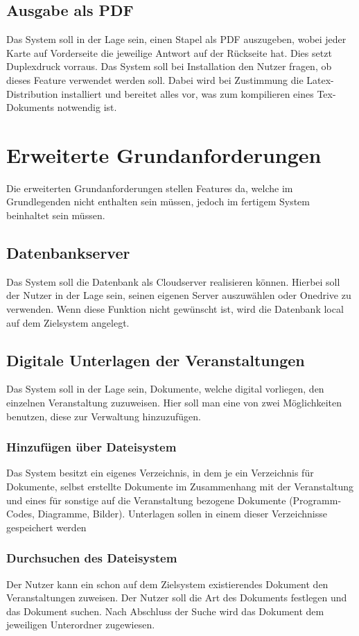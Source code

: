 \documentclass[
a4paper,
twoside,
DIV=12,
BCOR=8mm,
headlineinclude=true,
footinclude=false,
numbers=noenddot,
headheight=40pt, 11pt]{scrartcl}
\begin{document}
\subsection{Ausgabe als PDF}
Das System soll in der Lage sein, einen Stapel als PDF auszugeben, wobei jeder Karte auf Vorderseite die jeweilige Antwort auf der Rückseite hat. Dies setzt Duplexdruck vorraus. Das System soll bei Installation den Nutzer fragen, ob dieses Feature verwendet werden soll. Dabei wird bei Zustimmung die Latex-Distribution installiert und bereitet alles vor, was zum kompilieren eines Tex-Dokuments notwendig ist. 

\section{Erweiterte Grundanforderungen}
Die erweiterten Grundanforderungen stellen Features da, welche im Grundlegenden nicht enthalten sein müssen, jedoch im fertigem System beinhaltet sein müssen.
\subsection{Datenbankserver}
Das System soll die Datenbank als Cloudserver realisieren können. Hierbei soll der Nutzer in der Lage sein, seinen eigenen Server auszuwählen oder Onedrive zu verwenden. Wenn diese Funktion nicht gewünscht ist, wird die Datenbank local auf dem Zielsystem angelegt. 

\subsection{Digitale Unterlagen der Veranstaltungen}
Das System soll in der Lage sein, Dokumente, welche digital vorliegen, den einzelnen Veranstaltung zuzuweisen. Hier soll man eine von zwei Möglichkeiten benutzen, diese zur Verwaltung hinzuzufügen.
\subsubsection{Hinzufügen über Dateisystem}
Das System besitzt ein eigenes Verzeichnis, in dem je ein Verzeichnis für Dokumente, selbst erstellte Dokumente im Zusammenhang mit der Veranstaltung und eines für sonstige auf die Veranstaltung bezogene Dokumente (Programm-Codes, Diagramme, Bilder). Unterlagen sollen in einem dieser Verzeichnisse gespeichert werden
\subsubsection{Durchsuchen des Dateisystem}
Der Nutzer kann ein schon auf dem Zielsystem existierendes Dokument den Veranstaltungen zuweisen. Der Nutzer soll die Art des Dokuments festlegen und das Dokument suchen. Nach Abschluss der Suche wird das Dokument dem jeweiligen Unterordner zugewiesen.
\end{document}
